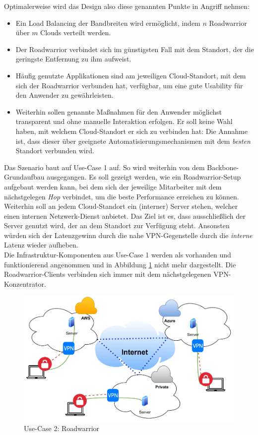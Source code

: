 Optimalerweise wird das Design also diese genannten Punkte in Angriff nehmen:
\begin{itemize}
\item Ein Load Balancing der Bandbreiten wird ermöglicht, indem $n$ \gls{Roadwarrior} über $m$ Clouds verteilt werden.
\item Der \gls{Roadwarrior} verbindet sich im günstigsten Fall mit dem Standort, der die geringste Entfernung zu ihm aufweist.
\item Häufig genutzte Applikationen sind am jeweiligen Cloud-Standort, mit dem sich der \gls{Roadwarrior} verbunden hat, verfügbar, um eine gute Usability für den Anwender zu gewährleisten.
\item Weiterhin sollen genannte Maßnahmen für den Anwender möglichst transparent und ohne manuelle Interaktion erfolgen. Er soll keine Wahl haben, mit welchem Cloud-Standort er sich zu verbinden hat: Die Annahme ist, dass dieser über geeignete Automatisierungsmechanismen mit dem \textit{besten} Standort verbunden wird.
\end{itemize}
Das Szenario baut auf Use-Case 1 auf. So wird weiterhin von dem Backbone-Grundaufbau ausgegangen. Es soll gezeigt werden, wie ein \gls{Roadwarrior}-Setup aufgebaut werden kann, bei dem sich der jeweilige Mitarbeiter mit dem nächstgelegen \textit{Hop} verbindet, um die beste Performance erreichen zu können. Weiterhin soll an jedem Cloud-Standort ein (interner) Server stehen, welcher einen internen Netzwerk-Dienst anbietet. Das Ziel ist es, dass ausschließlich der Server genutzt wird, der an dem Standort zur Verfügung steht. Ansonsten würden sich der Latenzgewinn durch die nahe VPN-Gegenstelle durch die \textit{interne} Latenz wieder aufheben.\\
Die Infrastruktur-Komponenten aus Use-Case 1 werden als vorhanden und funktionierend angenommen und in Abbildung \ref{grafik:Use-Case-2_Vereinfacht} nicht mehr dargestellt. Die \gls{Roadwarrior}-\gls{Client}s verbinden sich immer mit dem nächstgelegenen \gls{VPN-Konzentrator}.
\begin{figure}[h]
  \centering
  \includegraphics[scale=0.75]{Figures/Use-Case_2_Vereinfacht_1.pdf}
  \caption{Use-Case 2: \gls{Roadwarrior}}
  \label{grafik:Use-Case-2_Vereinfacht}
\end{figure}\FloatBarrier

